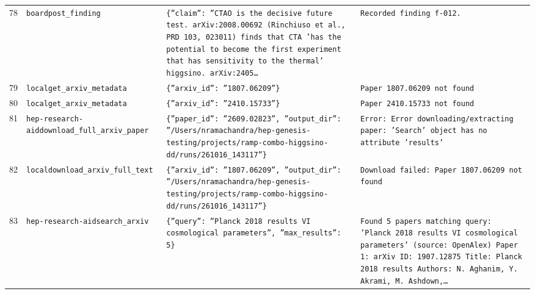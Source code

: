 \documentclass[11pt,a4paper]{article}
\begin{document}
\begin{longtable}{@{}p{}p{}p{}p{}@{}}
78 & \texttt{board}\newline\texttt{post\_\allowbreak{}finding} & \texttt{\{''claim'':\allowbreak{} ''CTAO is the decisive future test. arXiv:\allowbreak{}2008.00692 (Rinchiuso et al.,\allowbreak{} PRD 103,\allowbreak{} 023011)\allowbreak{} finds that CTA 'has the potential to become the first experiment that has sensitivity to the thermal' higgsino. arXiv:\allowbreak{}2405\ldots{}\allowbreak{}} & \texttt{Recorded finding f-012.} \\
79 & \texttt{local}\newline\texttt{get\_\allowbreak{}arxiv\_\allowbreak{}metadata} & \texttt{\{''arxiv\_\allowbreak{}id'':\allowbreak{} ''1807.06209''\}\allowbreak{}} & \texttt{Paper 1807.06209 not found} \\
80 & \texttt{local}\newline\texttt{get\_\allowbreak{}arxiv\_\allowbreak{}metadata} & \texttt{\{''arxiv\_\allowbreak{}id'':\allowbreak{} ''2410.15733''\}\allowbreak{}} & \texttt{Paper 2410.15733 not found} \\
81 & \texttt{hep-research-aid}\newline\texttt{download\_\allowbreak{}full\_\allowbreak{}arxiv\_\allowbreak{}paper} & \texttt{\{''paper\_\allowbreak{}id'':\allowbreak{} ''2609.02823'',\allowbreak{} ''output\_\allowbreak{}dir'':\allowbreak{} ''/\allowbreak{}Users/\allowbreak{}nramachandra/\allowbreak{}hep-genesis-testing/\allowbreak{}projects/\allowbreak{}ramp-combo-higgsino-dd/\allowbreak{}runs/\allowbreak{}261016\_\allowbreak{}143117''\}\allowbreak{}} & \texttt{Error:\allowbreak{} Error downloading/\allowbreak{}extracting paper:\allowbreak{} 'Search' object has no attribute 'results'} \\
82 & \texttt{local}\newline\texttt{download\_\allowbreak{}arxiv\_\allowbreak{}full\_\allowbreak{}text} & \texttt{\{''arxiv\_\allowbreak{}id'':\allowbreak{} ''1807.06209'',\allowbreak{} ''output\_\allowbreak{}dir'':\allowbreak{} ''/\allowbreak{}Users/\allowbreak{}nramachandra/\allowbreak{}hep-genesis-testing/\allowbreak{}projects/\allowbreak{}ramp-combo-higgsino-dd/\allowbreak{}runs/\allowbreak{}261016\_\allowbreak{}143117''\}\allowbreak{}} & \texttt{Download failed:\allowbreak{} Paper 1807.06209 not found} \\
83 & \texttt{hep-research-aid}\newline\texttt{search\_\allowbreak{}arxiv} & \texttt{\{''query'':\allowbreak{} ''Planck 2018 results VI cosmological parameters'',\allowbreak{} ''max\_\allowbreak{}results'':\allowbreak{} 5\}\allowbreak{}} & \texttt{Found 5 papers matching query:\allowbreak{} 'Planck 2018 results VI cosmological parameters' (source:\allowbreak{} OpenAlex)\allowbreak{}  Paper 1:\allowbreak{} arXiv ID:\allowbreak{} 1907.12875 Title:\allowbreak{} Planck 2018 results Authors:\allowbreak{} N. Aghanim,\allowbreak{} Y. Akrami,\allowbreak{} M. Ashdown,\allowbreak{}\ldots{}\allowbreak{}} \\

\end{longtable}
\end{document}
